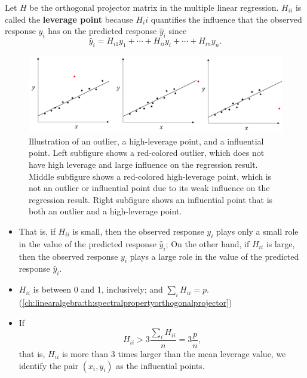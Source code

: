 \begin{refsection}
\begin{definition}[leverage]
Let $H$ be the orthogonal projector matrix in the multiple linear regression. $H_{ii}$ is called the \textbf{leverage point} because $H_ii$ quantifies the influence that the observed response $y_i$ has on the predicted response $\hat{y}_i$ since
$$\hat{y}_i = H_{i1}y_1 + \cdots + H_{ii}y_i + \cdots + H_{in}y_n.$$	
\end{definition}

\begin{figure}[H]
	\centering
	\includegraphics[width=1\linewidth]{../figures/statisticalModeling/regressionAnalysis/influencePointsLinearRegression}
	\caption{Illustration of an outlier, a high-leverage point, and a influential point. Left subfigure shows a red-colored outlier, which does not have high leverage and large influence on the regression result. Middle subfigure shows a red-colored high-leverage point, which is not an outlier or influential point due to its weak influence on the regression result. Right subfigure shows an influential point that is both an outlier and a high-leverage point.}
	\label{fig:influencepointslinearregression}
\end{figure}


\begin{note}\hfill
\begin{itemize}
	\item That is, if $H_{ii}$ is small, then the observed response $y_i$ plays only a small role in the value of the predicted response $\hat{y}_i$; On the other hand, if $H_{ii}$ is large, then the observed response $y_i$ plays a large role in the value of the predicted response $\hat{y}_i$.
	\item $H_{ii}$ is between 0 and 1, inclusively; and $\sum_i H_{ii} = p$.(\autoref{ch:linearalgebra:th:spectralpropertyorthogonalprojector})
	\item If $$H_{ii} > 3\frac{\sum_i H_{ii}}{n} = 3\frac{p}{n},$$
	that is, $H_{ii}$ is more than 3 times larger than the mean leverage value, we identify the pair $(x_i,y_i)$ as the influential points. 
\end{itemize}	
\end{note}







\end{refsection}
